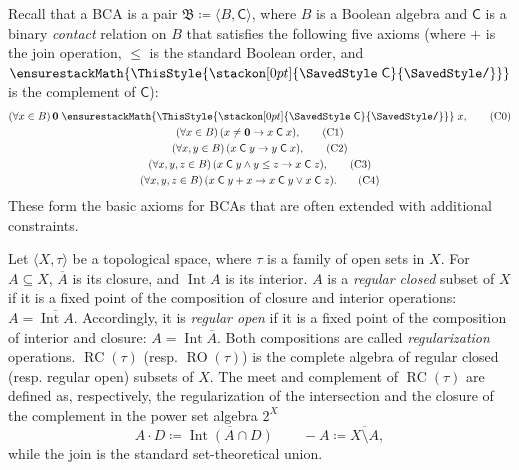 \documentclass[a4paper,12pt]{amsart}
\numberwithin{equation}{section}
\theoremstyle{mytheoremstyle}
\DeclareMathOperator{\Int}{Int}
\DeclareMathOperator{\RCvtex}{RC}
\DeclareMathOperator{\ROvtex}{RO}
\newcommand{\con}{\mathrel{\mathsf{C}}}
\newcommand\mathbackslash{\raisebox{.4pt}{\texttt{/}}}
\def\notcon{%
  \renewcommand\stacktype{L}\mathrel{\ensurestackMath{%
  \ThisStyle{\stackon[0pt]{\SavedStyle\con}{\SavedStyle\mathbackslash}}}}%
}
\begin{document}
Recall that a BCA is a pair
$\mathfrak{B}\coloneqq   \langle B,\mathrel{\mathsf{C}}
\rangle $, where $B$ is a Boolean algebra and $\mathrel{\mathsf{C}}$ is
a binary \emph{contact} relation on $B$ that satisfies the following five
axioms (where $+$ is the join operation, $\leq $ is the standard Boolean
order, and $\notcon $ is the complement of $\mathrel{\mathsf{C}}$):
%
\begin{gather}
(\forall x\in B)\,\mathbf{0}\notcon x, \tag{C0} \label{eqC0}
\\
(\forall x\in B)\,(x\neq \mathbf{0}\rightarrow x\mathrel{\mathsf{C}}x) ,
\tag{C1} \label{eqC1}
\\
(\forall x,y\in B)\,(x\mathrel{\mathsf{C}}y\rightarrow y\mathrel{ \mathsf{C}}x),
\tag{C2} \label{eqC2}
\\
(\forall x,y,z\in B)\,(x\mathrel{\mathsf{C}}y\wedge y\leq z \rightarrow x
\mathrel{\mathsf{C}}z), \tag{C3} \label{eqC3}
\\
(\forall x,y,z\in B)\,(x\mathrel{\mathsf{C}}y+x\rightarrow x\mathrel{
\mathsf{C}}y\vee x\mathrel{\mathsf{C}}z). \tag{C4} \label{C4} %
\end{gather}
%
These form the basic axioms for BCAs that are often extended with additional
constraints.

Let $  \langle X,\tau   \rangle $ be a topological space, where
$\tau $ is a family of open sets in $X$. For $A\subseteq X$,
$\overline{A}$ is its closure, and $\Int A$ is its interior. $A$ is a
\emph{regular closed} subset of $X$ if it is a fixed point of the composition
of closure and interior operations: $A=\overline{\Int A}$. Accordingly,
it is \emph{regular open} if it is a fixed point of the composition of interior
and closure: $A=\Int \overline{A}$. Both compositions are called
\emph{regularization} operations. $\RCvtex (\tau )$ (resp.
$\ROvtex (\tau )$) is the complete algebra of regular closed (resp. regular
open) subsets of $X$. The meet and complement of $\RCvtex (\tau )$ are defined
as, respectively, the regularization of the intersection and the closure
of the complement in the power set algebra $2^{X}$
%
\begin{equation*}
A\cdot D\coloneqq \overline{\Int (A\cap D)}\qquad {-}A\coloneqq \overline{X
\setminus A},
\end{equation*}
%
while the join is the standard set-theoretical union.
\end{document}
